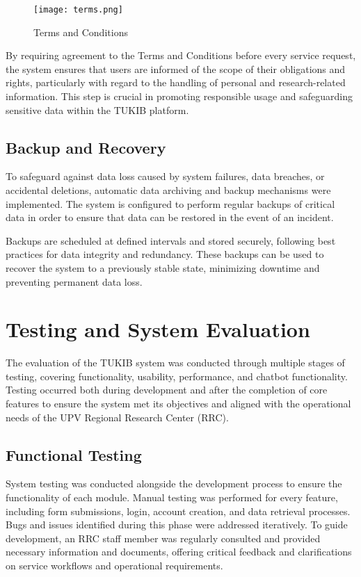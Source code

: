\begin{figure}[h]
	\centering
	\texttt{[image: terms.png]}
	\caption{Terms and Conditions}
	\label{fig:terms}
\end{figure}

By requiring agreement to the Terms and Conditions before every service request, the system ensures that users are informed of the scope of their obligations and rights, particularly with regard to the handling of personal and research-related information. This step is crucial in promoting responsible usage and safeguarding sensitive data within the TUKIB platform.

\subsection{Backup and Recovery}

To safeguard against data loss caused by system failures, data breaches, or accidental deletions, automatic data archiving and backup mechanisms were implemented. The system is configured to perform regular backups of critical data in order to ensure that data can be restored in the event of an incident.

Backups are scheduled at defined intervals and stored securely, following best practices for data integrity and redundancy. These backups can be used to recover the system to a previously stable state, minimizing downtime and preventing permanent data loss. 

\section{Testing and System Evaluation}

The evaluation of the TUKIB system was conducted through multiple stages of testing, covering functionality, usability, performance, and chatbot functionality. Testing occurred both during development and after the completion of core features to ensure the system met its objectives and aligned with the operational needs of the UPV Regional 
Research Center (RRC).

\subsection{Functional Testing}

System testing was conducted alongside the development process to ensure the functionality of each module. Manual testing was performed for every feature, including form submissions, login, account creation, and data retrieval processes. Bugs and issues identified during this phase were addressed iteratively. To guide development, an RRC staff member was regularly consulted and provided necessary information and documents, offering critical feedback and clarifications on service workflows and operational requirements.

